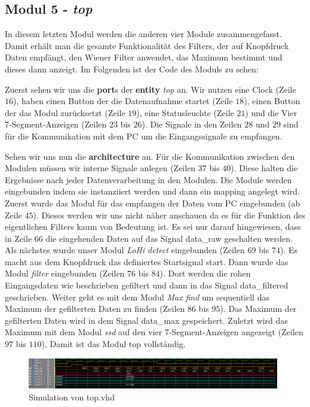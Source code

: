 \subsection{Modul 5 - \textit{top}}

In diesem letzten Modul werden die anderen vier Module zusammengefasst.
Damit erhält man die gesamte Funktionalität des Filters, der auf Knopfdruck Daten empfängt, den Wiener Filter anwendet, das Maximum bestimmt und dieses dann anzeigt.
Im Folgenden ist der Code des Moduls zu sehen:



Zuerst sehen wir uns die \textbf{port}s der \textbf{entity} \textit{top} an.
Wir nutzen eine Clock (Zeile $16$), haben einen Button der die Datenaufnahme startet (Zeile $18$), einen Button der das Modul zurücksetzt (Zeile $19$), eine Statusleuchte (Zeile $21$) und die Vier 7-Segment-Anzeigen (Zeilen $23$ bis $26$).
Die Signale in den Zeilen $28$ und $29$ sind für die Kommunikation mit dem PC um die Eingangssignale zu empfangen.

Sehen wir uns nun die \textbf{architecture} an.
Für die Kommunikation zwischen den Modulen müssen wir interne Signale anlegen (Zeilen $37$ bis $40$).
Diese halten die Ergebnisse nach jeder Datenverarbeitung in den Modulen.
Die Module werden eingebunden indem sie instanziiert werden und dann ein mapping angelegt wird.
Zuerst wurde das Modul für das empfangen der Daten vom PC eingebunden (ab Zeile $45$).
Dieses werden wir uns nicht näher anschauen da es für die Funktion des eigentlichen Filters kaum von Bedeutung ist.
Es sei nur darauf hingewiesen, dass in Zeile $66$ die eingehenden Daten auf das Signal data\_raw geschalten werden.
Als nächstes wurde unser Modul \textit{LoHi detect} eingebunden (Zeilen $69$ bis $74$).
Es macht aus dem Knopfdruck das definiertes Startsignal start.
Dann wurde das Modul \textit{filter} eingebunden (Zeilen $76$ bis $84$).
Dort werden die rohen Eingangsdaten wie beschrieben gefiltert und dann in das Signal data\_filtered geschrieben.
Weiter geht es mit dem Modul \textit{Max find} um sequentiell das Maximum der gefilterten Daten zu finden (Zeilen $86$ bis $95$).
Das Maximum der gefilterten Daten wird in dem Signal data\_max gespeichert.
Zuletzt wird das Maximum mit dem Modul \textit{ssd} auf den vier 7-Segment-Anzeigen angezeigt (Zeilen $97$ bis $110$).
Damit ist das Modul top vollständig.

\begin{figure}[ht]
	\centering
    \includegraphics[width=0.98\textwidth]{../Daten/top.png}
	\caption{Simulation von top.vhd}
	\label{img_top}
\end{figure}

